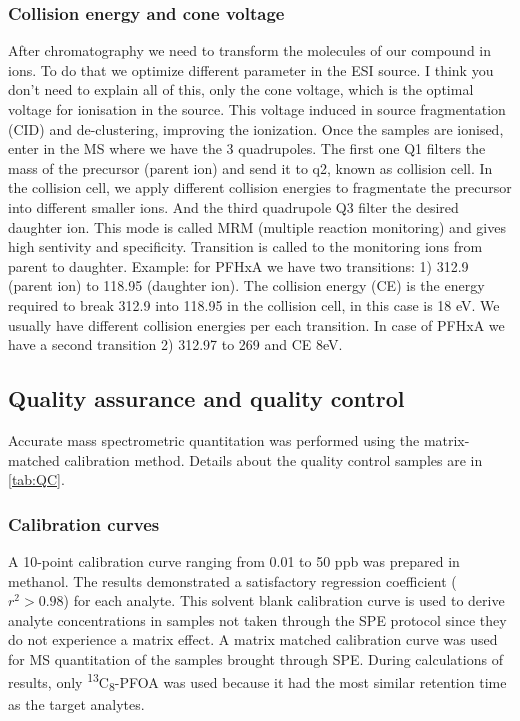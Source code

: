\subsubsection{Collision energy and cone voltage}
After chromatography we need to transform the molecules of our compound in ions. To do that we optimize different parameter in the ESI source. I think you don’t need to explain all of this, only the cone voltage, which is the optimal voltage for ionisation in the source. This voltage induced in source fragmentation (CID) and de-clustering, improving the ionization. Once the samples are ionised, enter in the MS where we have the 3 quadrupoles. The first one Q1 filters the mass of the precursor (parent ion) and send it to q2, known as collision cell. In the collision cell, we apply different collision energies to fragmentate the precursor into different smaller ions. And the third quadrupole Q3 filter the desired daughter ion. This mode is called MRM (multiple reaction monitoring) and gives high sentivity and specificity.
Transition is called to the monitoring ions from parent to daughter. 
Example: for PFHxA we have two transitions:
1)  312.9 (parent ion) to 118.95 (daughter ion). The collision energy (\acrshort{CE}) is the energy required to break 312.9 into 118.95 in the collision cell, in this case is 18 eV. We usually have different collision energies per each transition. In case of PFHxA we have a second transition 
2)  312.97 to 269 and CE 8eV.

\subsection{Quality assurance and quality control}
Accurate mass spectrometric quantitation was performed using the matrix-matched calibration method. Details about the quality control samples are in \cref{tab:QC}.

\subsubsection{Calibration curves}
A 10-point calibration curve ranging from 0.01 to 50 ppb was prepared in methanol. The results demonstrated a satisfactory regression coefficient ($r^2 > 0.98$) for each analyte. This solvent blank calibration curve is used to derive analyte concentrations in samples not taken through the SPE protocol since they do not experience a matrix effect. A matrix matched calibration curve was used for MS quantitation of the samples brought through SPE. 
During calculations of results, only \textsuperscript{13}C\textsubscript{8}-PFOA was used because it had the most similar retention time as the target analytes. 

